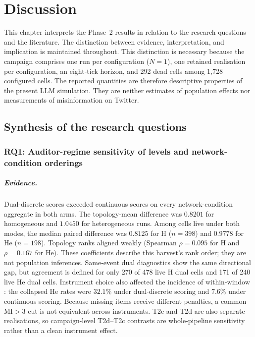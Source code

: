 \chapter{Discussion}
\label{chap:discussion}

This chapter interprets the Phase~2 results in relation to the research
questions and the literature.  The distinction between evidence,
interpretation, and implication is maintained throughout.  This distinction is
necessary because the campaign comprises one run per configuration
($N=1$), one retained realisation per configuration, an eight-tick horizon, and 292 dead cells among
1,728 configured cells.  The reported quantities are therefore descriptive
properties of the present LLM simulation.  They are neither estimates of
population effects nor measurements of misinformation on Twitter.

\section{Synthesis of the research questions}
\label{sec:discussion-rqs}

\subsection{RQ1: Auditor-regime sensitivity of levels and network-condition orderings}

\paragraph{Evidence.}
Dual-discrete scores exceeded continuous scores on every
network-condition aggregate in both arms. The topology-mean difference was
$0.8201$ for homogeneous and $1.0450$ for heterogeneous runs. Among cells
live under both modes, the median paired difference was $0.8125$ for H
($n=398$) and $0.9778$ for He ($n=198$). Topology ranks aligned weakly
(Spearman $\rho=0.095$ for H and $\rho=0.167$ for He). These coefficients
describe this harvest's rank order; they are not population inferences.
Same-event dual diagnostics show the same directional gap, but agreement is
defined for only 270 of 478 live H dual cells and 171 of 240 live He dual
cells. Instrument choice also affected the incidence of within-window
\kstar{}: the collapsed He rates were $32.1\%$ under dual-discrete scoring
and $7.6\%$ under continuous scoring. Because missing items receive different
penalties, a common $\mathrm{MI}>3$ cut is not equivalent across instruments.
T2c and T2d are also separate realisations, so campaign-level T2d--T2c
contrasts are whole-pipeline sensitivity rather than a clean instrument
effect.

